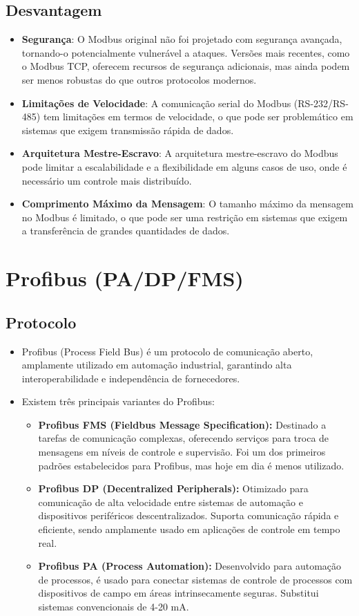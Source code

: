 \documentclass[a4paper,11pt]{article} %
\begin{document}
\subsection{Desvantagem}
\begin{itemize}
    \item \textbf{Segurança}: O Modbus original não foi projetado com segurança avançada, tornando-o potencialmente vulnerável a ataques. Versões mais recentes, como o Modbus TCP, oferecem recursos de segurança adicionais, mas ainda podem ser menos robustas do que outros protocolos modernos.
    \item \textbf{Limitações de Velocidade}: A comunicação serial do Modbus (RS-232/RS-485) tem limitações em termos de velocidade, o que pode ser problemático em sistemas que exigem transmissão rápida de dados.
    \item \textbf{Arquitetura Mestre-Escravo}: A arquitetura mestre-escravo do Modbus pode limitar a escalabilidade e a flexibilidade em alguns casos de uso, onde é necessário um controle mais distribuído.
    \item \textbf{Comprimento Máximo da Mensagem}: O tamanho máximo da mensagem no Modbus é limitado, o que pode ser uma restrição em sistemas que exigem a transferência de grandes quantidades de dados.
\end{itemize}

\section{Profibus (PA/DP/FMS)}

\subsection{Protocolo}
\begin{itemize}
    \item Profibus (Process Field Bus) é um protocolo de comunicação aberto, amplamente utilizado em automação industrial, garantindo alta interoperabilidade e independência de fornecedores.
    \item Existem três principais variantes do Profibus:
    \begin{itemize}
        \item \textbf{Profibus FMS (Fieldbus Message Specification):} Destinado a tarefas de comunicação complexas, oferecendo serviços para troca de mensagens em níveis de controle e supervisão. Foi um dos primeiros padrões estabelecidos para Profibus, mas hoje em dia é menos utilizado.
        \item \textbf{Profibus DP (Decentralized Peripherals):} Otimizado para comunicação de alta velocidade entre sistemas de automação e dispositivos periféricos descentralizados. Suporta comunicação rápida e eficiente, sendo amplamente usado em aplicações de controle em tempo real.
        \item \textbf{Profibus PA (Process Automation):} Desenvolvido para automação de processos, é usado para conectar sistemas de controle de processos com dispositivos de campo em áreas intrinsecamente seguras. Substitui sistemas convencionais de 4-20 mA.
    \end{itemize}
\end{itemize}
\end{document}
